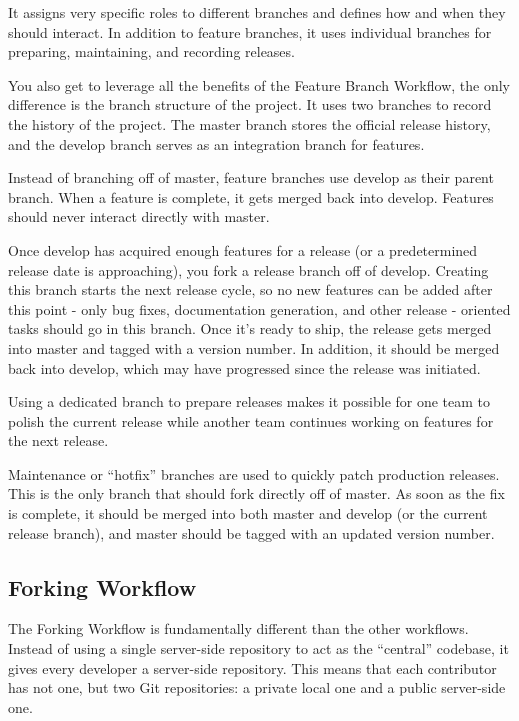 \documentclass{article}
\begin{document}
It assigns very specific roles to different branches and defines how
and when they should interact. In addition to feature branches, it
uses individual branches for preparing, maintaining, and recording
releases. 

You also get to leverage all the benefits of the Feature Branch
Workflow, the only difference is the branch structure of the project.
It uses two branches to record the history of the project. The master
branch stores the official release history, and the develop branch
serves as an integration branch for features.

Instead of branching off of master, feature branches use develop as
their parent branch. When a feature is complete, it gets merged back
into develop. Features should never interact directly with master.

Once develop has acquired enough features for a release (or a
predetermined release date is approaching), you fork a release branch
off of develop. Creating this branch starts the next release cycle, so
no new features can be added after this point - only bug fixes,
documentation generation, and other release - oriented tasks should go
in this branch. Once it's ready to ship, the release gets merged into
master and tagged with a version number. In addition, it should be
merged back into develop, which may have progressed since the release
was initiated.

Using a dedicated branch to prepare releases makes it possible for one
team to polish the current release while another team continues
working on features for the next release.

Maintenance or ``hotfix'' branches are used to quickly patch production
releases. This is the only branch that should fork directly off of
master. As soon as the fix is complete, it should be merged into both
master and develop (or the current release branch), and master should
be tagged with an updated version number.

\subsection{Forking Workflow}

The Forking Workflow is fundamentally different than the other
workflows. Instead of using a single
server-side repository to act as the ``central'' codebase, it gives
every developer a server-side repository. This means that each
contributor has not one, but two Git repositories: a private local one
and a public server-side one.
\end{document}
